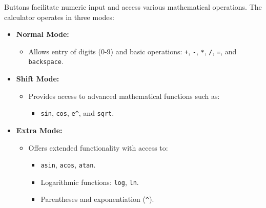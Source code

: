 Buttons facilitate numeric input and access various mathematical operations. The calculator operates in three modes:
\vspace{2cm}
\begin{itemize}
    \item \textbf{Normal Mode:} 
    \begin{itemize}
        \item Allows entry of digits (0-9) and basic operations: \texttt{+}, \texttt{-}, \texttt{*}, \texttt{/}, \texttt{=}, and \texttt{backspace}.
    \end{itemize}

    \item \textbf{Shift Mode:}
    \begin{itemize}
        \item Provides access to advanced mathematical functions such as:
        \begin{itemize}
            \item \texttt{sin}, \texttt{cos}, \texttt{e^{}}, and \texttt{sqrt}.
        \end{itemize}
    \end{itemize}

    \item \textbf{Extra Mode:} 
    \begin{itemize}
        \item Offers extended functionality with access to:
        \begin{itemize}
            \item \texttt{asin}, \texttt{acos}, \texttt{atan}.
            \item Logarithmic functions: \texttt{log}, \texttt{ln}.
            \item Parentheses and exponentiation (\texttt{^}).
        \end{itemize}
    \end{itemize}
\end{itemize}


